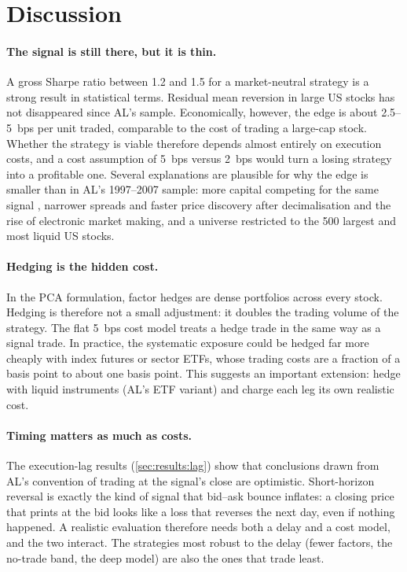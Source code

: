 \section{Discussion}
\label{sec:discussion}

\paragraph{The signal is still there, but it is thin.}
A gross Sharpe ratio between 1.2 and 1.5 for a market-neutral strategy is a strong result in
statistical terms. Residual mean reversion in large US stocks has not disappeared since AL's
sample. Economically, however, the edge is about 2.5--5~bps per unit traded, comparable to the
cost of trading a large-cap stock. Whether the strategy is viable therefore depends almost
entirely on execution costs, and a cost assumption of 5~bps versus 2~bps would turn a losing
strategy into a profitable one. Several explanations are plausible for why the edge is smaller
than in AL's 1997--2007 sample: more capital competing for the same signal \citep{khandani2007},
narrower spreads and faster price discovery after decimalisation and the rise of electronic
market making, and a universe restricted to the 500 largest and most liquid US stocks.

\paragraph{Hedging is the hidden cost.}
In the PCA formulation, factor hedges are dense portfolios across every stock. Hedging is
therefore not a small adjustment: it doubles the trading volume of the strategy. The flat 5~bps
cost model treats a hedge trade in the same way as a signal trade. In practice, the systematic
exposure could be hedged far more cheaply with index futures or sector ETFs, whose trading costs
are a fraction of a basis point to about one basis point. This suggests an important extension:
hedge with liquid instruments (AL's ETF variant) and charge each leg its own realistic cost.

\paragraph{Timing matters as much as costs.}
The execution-lag results (\cref{sec:results:lag}) show that conclusions drawn from AL's
convention of trading at the signal's close are optimistic. Short-horizon reversal is exactly the
kind of signal that bid--ask bounce inflates: a closing price that prints at the bid looks like a
loss that reverses the next day, even if nothing happened. A realistic evaluation therefore needs
both a delay and a cost model, and the two interact. The strategies most robust to the delay
(fewer factors, the no-trade band, the deep model) are also the ones that trade least.

